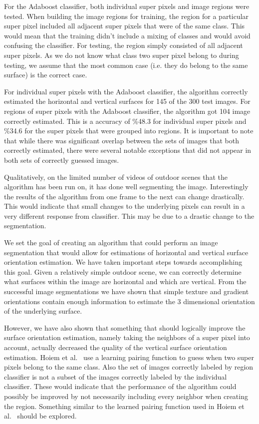 \documentclass[times,10pt,twocolumn]{article}
\begin{document}
For the Adaboost classifier, both individual super pixels and image regions
were tested. When building the image regions for training, the region for a
particular super pixel included all adjacent super pixels that were of the same
class. This would mean that the training didn't include a mixing of classes and
would avoid confusing the classifier. For testing, the region simply consisted
of all adjacent super pixels. As we do not know what class two super pixel
belong to during testing, we assume that the most common case (i.e. they do
belong to the same surface) is the correct case.

For individual super pixels with the Adaboost classifier, the algorithm
correctly estimated the horizontal and vertical surfaces for 145 of the 300
test images. For regions of super pixels with the Adaboost classifier, the
algorithm got 104 image correctly estimated. This is a accuracy of \%48.3 for
individual super pixels and \%34.6 for the super pixels that were grouped into
regions. It is important to note that while there was significant overlap
between the sets of images that both correctly estimated, there were several
notable exceptions that did not appear in both sets of correctly guessed
images.

Qualitatively, on the limited number of videos of outdoor scenes that the
algorithm has been run on, it has done well segmenting the image. Interestingly
the results of the algorithm from one frame to the next can change drastically.
This would indicate that small changes to the underlying pixels can result in
a very different response from classifier. This may be due to a drastic change
to the segmentation.


We set the goal of creating an algorithm that could perform an image
segmentation that would allow for estimations of horizontal and vertical
surface orientation estimation. We have taken important steps towards
accomplishing this goal. Given a relatively simple outdoor scene, we can
correctly determine what surfaces within the image are horizontal and which are
vertical. From the successful image segmentations we have shown that simple
texture and gradient orientations contain enough information to estimate the 3
dimensional orientation of the underlying surface.


However, we have also shown that something that should logically improve the 
surface orientation estimation, namely taking the neighbors of a super pixel
into account, actually decreased the quality of the vertical surface
orientation estimation. Hoiem et al.~\cite{Hoiem-05} use a learning pairing
function to guess when two super pixels belong to the same class. Also the set
of images correctly labeled by region classifier is not a subset of the images
correctly labeled by the individual classifier. These would indicate that
the performance of the algorithm could possibly be improved by not necessarily
including every neighbor when creating the region. Something similar to the
learned pairing function used in Hoiem et al.~\cite{Hoiem-05} should be
explored.



\end{document}
